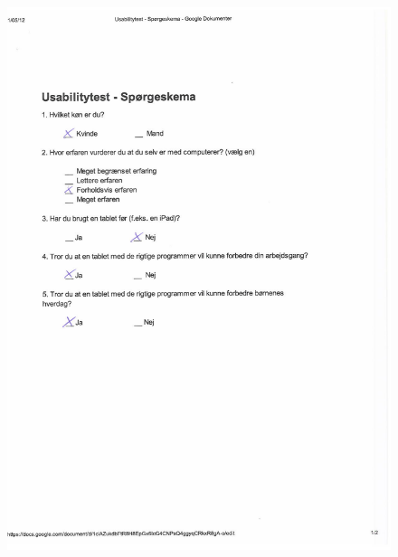 \begin{figure}
	\centering
		\includegraphics{input/appendices/demo_t1.pdf}
	\label{fig:demo_t}
\end{figure}

